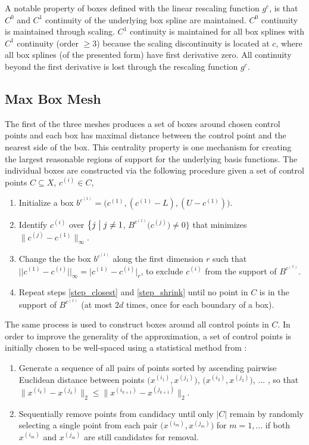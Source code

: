 A notable property of boxes defined with the linear rescaling function $g^c$, is that $C^0$ and $C^1$ continuity of the underlying box spline are maintained. $C^0$ continuity is maintained through scaling. $C^1$ continuity is maintained for all box splines with $C^1$ continuity (order $\geq 3$) because the scaling discontinuity is located at $c$, where all box splines (of the presented form) have first derivative zero. All continuity beyond the first derivative is lost through the rescaling function $g^c$.

\subsection{Max Box Mesh}

The first of the three meshes produces a set of boxes around chosen control points and each box has maximal distance between the control point and the nearest side of the box. This centrality property is one mechanism for creating the largest reasonable regions of support for the underlying basis functions. The individual boxes are constructed via the following procedure given a set of control points $C \subseteq X$, $c^{(i)} \in C$,
\begin{enumerate}
  \item Initialize a box $b^{c^{(1)}} = \bigl(c^{(1)}, (c^{(1)} - L), (U - c^{(1)})\bigr)$. \label{step_init}
  \item Identify $c^{(i)}$ over $\bigl\{ j \bigm| j \ne 1$, $B^{c^{(1)}}\bigl( c^{(j)} \bigr) \ne 0 \bigr\}$ that minimizes $\bigl\|c^{(j)}-c^{(1)}\bigr\|_\infty$.  \label{step_closest}
  \item Change the the box $b^{c^{(1)}}$ along the first dimension $r$ such that $\bigl|\bigl|c^{(1)} - c^{(i)}\bigr|\bigr|_\infty = \bigl\vert c^{(1)} - c^{(i)}\bigr\vert_r $, to exclude $c^{(i)}$ from the support of $B^{c^{(1)}}$. \label{step_shrink}
  \item Repeat steps \ref{step_closest} and \ref{step_shrink} until no point in $C$ is in the support of $B^{c^{(1)}}$ (at most $2d$ times, once for each boundary of a box).
\end{enumerate}

The same process is used to construct boxes around all control points in $C$. In order to improve the generality of the approximation, a set of control points is initially chosen to be well-spaced using a statistical method from \cite{amos2014algorithm}:

\begin{enumerate}
\item Generate a sequence of all pairs of points sorted by ascending pairwise Euclidean distance between points $\bigl(x^{(i_1)},x^{(j_1)}\bigr)$, $\bigl(x^{(i_2)},x^{(j_2)}\bigr)$, $\ldots$ , so that $\bigl\|x^{(i_k)}-x^{(j_k)}\bigr\|_2 \leq \bigl\|x^{(i_{k+1})}-x^{(j_{k+1})}\bigr\|_2$.
\item Sequentially remove points from candidacy until only $|C|$ remain by randomly selecting a single point from each pair $\bigl(x^{(i_m)}, x^{(j_m)}\bigr)$ for $m = 1,\ldots$ if both $x^{(i_m)}$ and $x^{(j_m)}$ are still candidates for removal.
\end{enumerate}

